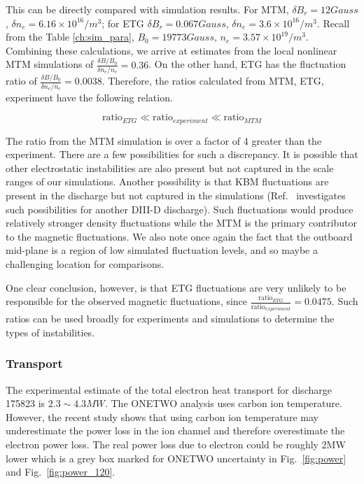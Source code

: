 \documentclass[
 aip,
 amsmath,amssymb,
 reprint
]{revtex4-1}
\begin{document}
This can be directly compared with simulation results.  For MTM, $\delta B_r=12Gauss$, $\delta n_e=6.16\times 10^{16}/m^3$; for ETG $\delta B_r=0.067Gauss$, $\delta n_e=3.6\times 10^{16}/m^3$. Recall from the Table \ref{ch:sim_para}, $B_0=19773Gauss$, $n_e=3.57\times 10^{19}/m^3$.  Combining these calculations, we arrive at estimates from the local nonlinear MTM simulations of $\frac{\delta B/B_0}{\delta n_e/n_e}= 0.36$. 
On the other hand, ETG has the fluctuation ratio of $\frac{\delta B/B_0}{\delta n_e/n_e}= 0.0038 $. Therefore, the ratios calculated from MTM, ETG, experiment have the following relation.  %

\begin{equation}
   \text{ratio}_{ETG}\ll \text{ratio}_{experiment} \ll \text{ratio}_{MTM} 
\end{equation}

The ratio from the MTM simulation is over a factor of 4 greater than the experiment. There are a few possibilities for such a discrepancy. It is possible that other electrostatic instabilities are also present but not captured in the scale ranges of our simulations.  Another possibility is that KBM fluctuations are present in the discharge but not captured in the simulations (Ref.~\cite{Halfmoon_MTM} investigates such possibilities for another DIII-D discharge).  Such fluctuations would produce relatively stronger density fluctuations while the MTM is the primary contributor to the magnetic fluctuations. We also note once again the fact that the outboard mid-plane is a region of low simulated fluctuation levels, and so maybe a challenging location for comparisons.  

One clear conclusion, however, is that ETG fluctuations are very unlikely to be responsible for the observed magnetic fluctuations, since $\frac{\text{ratio}_{ETG}}{\text{ratio}_{experiment}} =0.0475 $. Such ratios can be used broadly for experiments and simulations to determine the types of instabilities\cite{Kotschenreuther_2019}. 

\subsubsection{Transport}

The experimental estimate of the total electron heat transport for discharge 175823 is $2.3\sim4.3MW$. The ONETWO analysis uses carbon ion temperature. However, the recent study 
\cite{Haskey_2022} shows that using carbon ion temperature may underestimate the power loss in the ion channel and therefore overestimate the electron power loss. The real power loss due to electron could be roughly 2MW lower which is a grey box marked for ONETWO uncertainty in Fig.~\ref{fig:power} and Fig.~\ref{fig:power_120}. 
\end{document}
